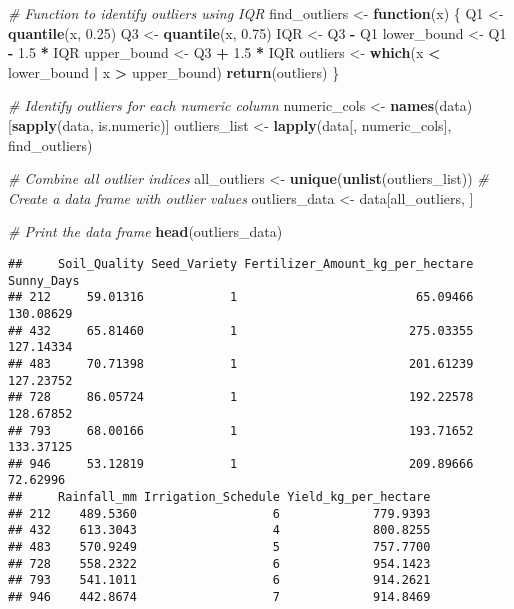 \documentclass[
]{article}
\newenvironment{Shaded}{\begin{snugshade}}{\end{snugshade}}
\newcommand{\CommentTok}[1]{\textcolor[rgb]{0.56,0.35,0.01}{\textit{#1}}}
\newcommand{\ControlFlowTok}[1]{\textcolor[rgb]{0.13,0.29,0.53}{\textbf{#1}}}
\newcommand{\FloatTok}[1]{\textcolor[rgb]{0.00,0.00,0.81}{#1}}
\newcommand{\FunctionTok}[1]{\textcolor[rgb]{0.13,0.29,0.53}{\textbf{#1}}}
\newcommand{\NormalTok}[1]{#1}
\newcommand{\OtherTok}[1]{\textcolor[rgb]{0.56,0.35,0.01}{#1}}
\newcommand{\SpecialCharTok}[1]{\textcolor[rgb]{0.81,0.36,0.00}{\textbf{#1}}}
\begin{document}
\begin{Shaded}
\begin{Highlighting}[]
\CommentTok{\# Function to identify outliers using IQR}
\NormalTok{find\_outliers }\OtherTok{\textless{}{-}} \ControlFlowTok{function}\NormalTok{(x) \{}
\NormalTok{  Q1 }\OtherTok{\textless{}{-}} \FunctionTok{quantile}\NormalTok{(x, }\FloatTok{0.25}\NormalTok{)}
\NormalTok{  Q3 }\OtherTok{\textless{}{-}} \FunctionTok{quantile}\NormalTok{(x, }\FloatTok{0.75}\NormalTok{)}
\NormalTok{  IQR }\OtherTok{\textless{}{-}}\NormalTok{ Q3 }\SpecialCharTok{{-}}\NormalTok{ Q1}
\NormalTok{  lower\_bound }\OtherTok{\textless{}{-}}\NormalTok{ Q1 }\SpecialCharTok{{-}} \FloatTok{1.5} \SpecialCharTok{*}\NormalTok{ IQR}
\NormalTok{  upper\_bound }\OtherTok{\textless{}{-}}\NormalTok{ Q3 }\SpecialCharTok{+} \FloatTok{1.5} \SpecialCharTok{*}\NormalTok{ IQR}
\NormalTok{  outliers }\OtherTok{\textless{}{-}} \FunctionTok{which}\NormalTok{(x }\SpecialCharTok{\textless{}}\NormalTok{ lower\_bound }\SpecialCharTok{|}\NormalTok{ x }\SpecialCharTok{\textgreater{}}\NormalTok{ upper\_bound)}
  \FunctionTok{return}\NormalTok{(outliers)}
\NormalTok{\}}

\CommentTok{\# Identify outliers for each numeric column}
\NormalTok{numeric\_cols }\OtherTok{\textless{}{-}} \FunctionTok{names}\NormalTok{(data)[}\FunctionTok{sapply}\NormalTok{(data, is.numeric)]}
\NormalTok{outliers\_list }\OtherTok{\textless{}{-}} \FunctionTok{lapply}\NormalTok{(data[, numeric\_cols], find\_outliers)}

\CommentTok{\# Combine all outlier indices}
\NormalTok{all\_outliers }\OtherTok{\textless{}{-}} \FunctionTok{unique}\NormalTok{(}\FunctionTok{unlist}\NormalTok{(outliers\_list))}
\CommentTok{\# Create a  data frame with outlier values}
\NormalTok{outliers\_data }\OtherTok{\textless{}{-}}\NormalTok{ data[all\_outliers, ]}

\CommentTok{\# Print the data frame}
\FunctionTok{head}\NormalTok{(outliers\_data)}
\end{Highlighting}
\end{Shaded}

\begin{verbatim}
##     Soil_Quality Seed_Variety Fertilizer_Amount_kg_per_hectare Sunny_Days
## 212     59.01316            1                         65.09466  130.08629
## 432     65.81460            1                        275.03355  127.14334
## 483     70.71398            1                        201.61239  127.23752
## 728     86.05724            1                        192.22578  128.67852
## 793     68.00166            1                        193.71652  133.37125
## 946     53.12819            1                        209.89666   72.62996
##     Rainfall_mm Irrigation_Schedule Yield_kg_per_hectare
## 212    489.5360                   6             779.9393
## 432    613.3043                   4             800.8255
## 483    570.9249                   5             757.7700
## 728    558.2322                   6             954.1423
## 793    541.1011                   6             914.2621
## 946    442.8674                   7             914.8469
\end{verbatim}
\end{document}
